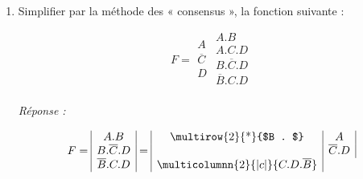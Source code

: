 \begin{enumerate} [label=\arabic*$^\circ$]
\emph{Réponse :}



\[ \pi = 
\begin{array}{|c|c|c|c|c|} A & A & A & A & \overline{A} \\
                           B & B & B & B & B \\
                           C & C & \overline{C}    & \overline{C}  & \overline{C}   \\
                           D  & \overline{D} & D & \overline{D}& \overline{D}  \end{array}
                               = \begin{array}{|c|c|} 
\multicolumnn{2}{|c|}{B} \\
                                    $\multirow{2}{*}{$ A . $}$  & \overline{C} \\
                                                              & \overline{D} \\
                                 \end{array} 
\]



\item Simplifier par la méthode des « consensus », la fonction suivante :


\[ F = 
\begin{array}{|c}  A \\ \overline{C} \\ D \\    \end{array}
      \begin{array}{|c|} A . B \\
					A . C . D \\
					B . \overline{C} . D \\
					\overline{B} . C . D \\	      
       \end{array} 
\]





\emph{Réponse :}



\[ F = 
\begin{array}{|c|} 
      A . B \\
     B . \overline{C} . D \\
     \overline{B} . C . D \\            
\end{array}
    = \begin{array}{|c|c|} 
         $\multirow{2}{*}{$B . $}$   & A \\
                                     & \overline{C} . D \\
\multicolumnn{2}{|c|}{C . D . \overline{B}} \\                            
      \end{array} 
\]




\end{enumerate}
